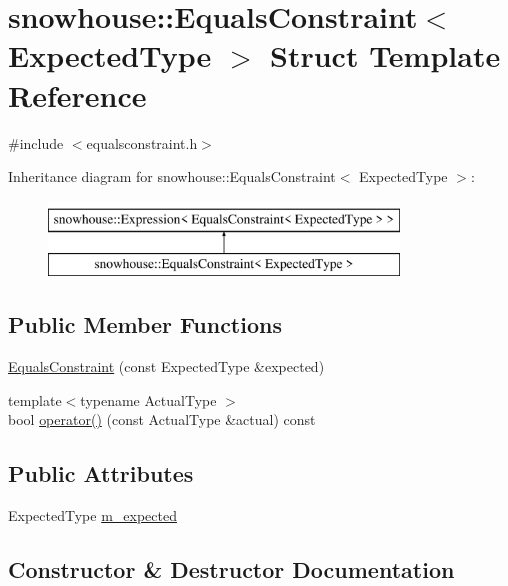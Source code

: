 \hypertarget{structsnowhouse_1_1EqualsConstraint}{}\section{snowhouse\+::Equals\+Constraint$<$ Expected\+Type $>$ Struct Template Reference}
\label{structsnowhouse_1_1EqualsConstraint}


{\ttfamily \#include $<$equalsconstraint.\+h$>$}

Inheritance diagram for snowhouse\+::Equals\+Constraint$<$ Expected\+Type $>$\+:\begin{figure}[H]
\begin{center}
\leavevmode
\includegraphics[height=2.000000cm]{structsnowhouse_1_1EqualsConstraint}
\end{center}
\end{figure}
\subsection*{Public Member Functions}
\begin{DoxyCompactItemize}
\item 
\mbox{\hyperlink{structsnowhouse_1_1EqualsConstraint_a8ab60bdf02484fe996489c91458d6481}{Equals\+Constraint}} (const Expected\+Type \&expected)
\item 
{\footnotesize template$<$typename Actual\+Type $>$ }\\bool \mbox{\hyperlink{structsnowhouse_1_1EqualsConstraint_ad2607165474aeedd79d210ceeac07dcb}{operator()}} (const Actual\+Type \&actual) const
\end{DoxyCompactItemize}
\subsection*{Public Attributes}
\begin{DoxyCompactItemize}
\item 
Expected\+Type \mbox{\hyperlink{structsnowhouse_1_1EqualsConstraint_af7abf04eeaf13fce36215a5a31726375}{m\+\_\+expected}}
\end{DoxyCompactItemize}


\subsection{Constructor \& Destructor Documentation}
\mbox{\label{structsnowhouse_1_1EqualsConstraint_a8ab60bdf02484fe996489c91458d6481}} 
